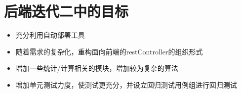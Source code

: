 \documentclass{ctexart}
\begin{document}
    \section{后端迭代二中的目标}
        \begin{itemize}
            \item 充分利用自动部署工具

            \item 随着需求的复杂化，重构面向前端的restController的组织形式

            \item 增加一些统计/计算相关的模块，增加较为复杂的算法

            \item 增加单元测试力度，使测试更充分，并设立回归测试用例组进行回归测试
        \end{itemize}

    
\end{document}
